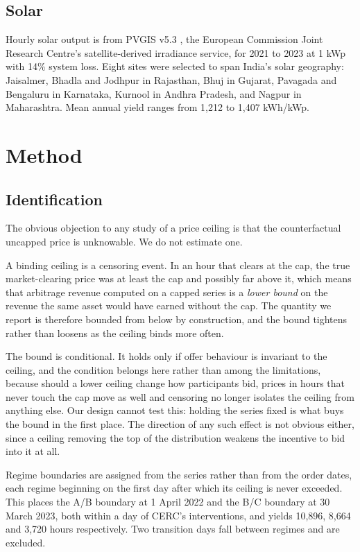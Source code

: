 \documentclass[conference,a4paper]{IEEEtran}
\begin{document}
\subsection{Solar}

Hourly solar output is from PVGIS v5.3 \cite{pvgis}, the European Commission
Joint Research Centre's satellite-derived irradiance service, for 2021 to 2023 at
1 kWp with 14\% system loss. Eight sites were selected to span India's solar
geography: Jaisalmer, Bhadla and Jodhpur in Rajasthan, Bhuj in Gujarat, Pavagada
and Bengaluru in Karnataka, Kurnool in Andhra Pradesh, and Nagpur in
Maharashtra. Mean annual yield ranges from 1,212 to 1,407 kWh/kWp.

\section{Method}

\subsection{Identification}

The obvious objection to any study of a price ceiling is that the counterfactual
uncapped price is unknowable. We do not estimate one.

A binding ceiling is a censoring event. In an hour that clears at the cap, the
true market-clearing price was at least the cap and possibly far above it, which
means that arbitrage revenue computed on a capped series is a \emph{lower bound}
on the revenue the same asset would have earned without the cap. The quantity we
report is therefore bounded from below by construction, and the bound tightens
rather than loosens as the ceiling binds more often.

The bound is conditional. It holds only if offer behaviour is invariant to the
ceiling, and the condition belongs here rather than among the limitations,
because should a lower ceiling change how participants bid, prices in hours that
never touch the cap move as well and censoring no longer isolates the ceiling
from anything else. Our design cannot test this: holding the series fixed is
what buys the bound in the first place. The direction of any such effect is not
obvious either, since a ceiling removing the top of the distribution weakens the
incentive to bid into it at all.

Regime boundaries are assigned from the series rather than from the order dates,
each regime beginning on the first day after which its ceiling is never exceeded.
This places the A/B boundary at 1 April 2022 and the B/C boundary at 30 March
2023, both within a day of CERC's interventions, and yields 10,896, 8,664 and
3,720 hours respectively. Two transition days fall between regimes and are
excluded.
\end{document}
